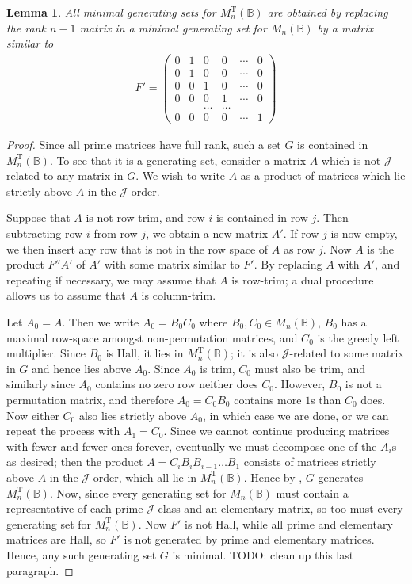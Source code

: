 \documentclass[11pt]{article}
\newtheorem{lemma}[thm]{Lemma}
\numberwithin{equation}{section}
\newcommand{\B}{\mathbb{B}}
\newcommand{\Bn}{M_n(\B)}
\newcommand{\MTn}{M_n^{\text{T}}(\B)}
\newcommand{\J}{\mathscr{J}}
\begin{document}
\begin{lemma}
  All minimal generating sets for $\MTn$ are obtained by replacing the rank $n -
  1$ matrix in a minimal generating set for $\Bn$ by a matrix similar to
  \begin{align*}
    F' = \begin{pmatrix}
      0 & 1 & 0 & 0 & \cdots & 0 \\
      0 & 1 & 0 & 0 & \cdots & 0 \\
      0 & 0 & 1 & 0 & \cdots & 0 \\
      0 & 0 & 0 & 1 & \cdots & 0 \\
        &   &   \dots & \dots & \\
      0 & 0 & 0 & 0 & \cdots & 1
    \end{pmatrix}
  \end{align*}
\end{lemma}
\begin{proof}
  Since all prime matrices have full rank, such a set $G$ is contained in
  $\MTn$. To see that it is a generating set, consider a matrix $A$ which is not
  $\J$-related to any matrix in $G$. We wish to write $A$ as a product of
  matrices which lie strictly above $A$ in the $\J$-order. 
  
  Suppose that $A$ is not row-trim, and row $i$ is contained in row $j$. Then
  subtracting row $i$ from row $j$, we obtain a new matrix $A'$. If row $j$ is
  now empty, we then insert any row that is not in the row space of $A$ as row
  $j$. Now $A$ is the product $F''A'$ of $A'$ with some matrix similar to $F'$. By
  replacing $A$ with $A'$, and repeating if necessary, we may assume that $A$ is
  row-trim; a dual procedure allows us to assume that $A$ is column-trim. 
  
  Let $A_0 = A$. Then we write $A_0 = B_0C_0$ where $B_0, C_0 \in \Bn$, $B_0$ has a
  maximal row-space amongst non-permutation matrices, and $C_0$ is the greedy left
  multiplier. Since $B_0$ is Hall, it lies in $\MTn$; it is also $\J$-related to
  some matrix in $G$ and hence lies above $A_0$. Since $A_0$ is trim, $C_0$ must also
  be trim, and similarly since $A_0$ contains no zero row neither does $C_0$.
  However, $B_0$ is not a permutation matrix, and therefore $A_0 = C_0B_0$ contains more
  $1$s than $C_0$ does. Now either $C_0$ also lies strictly above $A_0$, in which case
  we are done, or we can repeat the process with $A_1 = C_0$. Since we
  cannot continue producing matrices with fewer and fewer ones forever,
  eventually we must decompose one of the $A_i$s as desired; then the product $A
  = C_i B_i B_{i - 1} \ldots B_1$ consists of matrices strictly above $A$ in the
  $\J$-order, which all lie in $\MTn$. Hence by ,
  $G$ generates $\MTn$.
  Now, since every generating set for $\Bn$ must contain a representative of
  each prime $\J$-class and an elementary matrix, so too must every generating
  set for $\MTn$. Now $F'$ is not Hall, while all prime and elementary matrices
  are Hall, so $F'$ is not generated by prime and elementary matrices. Hence,
  any such generating set $G$ is minimal. TODO: clean up this last paragraph.
\end{proof}
\end{document}
